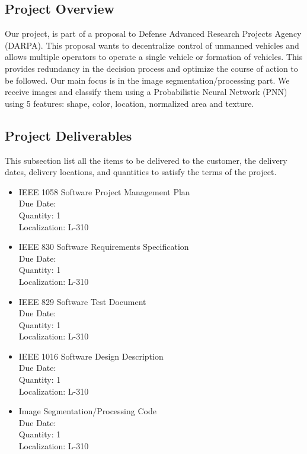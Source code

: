 \documentclass[12pt]{article}
\begin{document}
\subsection{Project Overview}
 Our project, is part of a proposal to Defense Advanced Research Projects Agency (DARPA). This proposal wants to decentralize control of unmanned vehicles and allows multiple operators to operate a single vehicle or formation of vehicles. This provides redundancy in the decision process and optimize the course of action to be followed. Our main focus is in the image segmentation/processing part. We receive images and classify them using a Probabilistic Neural Network (PNN) using 5 features: shape, color, location, normalized area and texture.

\subsection{Project Deliverables}
This subsection list all the items to be delivered to the customer, the delivery dates, delivery locations, and quantities to satisfy the terms of the project.
\begin{itemize}
  \item IEEE 1058 Software Project Management Plan\\
            Due Date: \\
            Quantity: 1\\
            Localization: L-310
  \item IEEE 830 Software Requirements Specification\\
            Due Date: \\
            Quantity: 1\\
            Localization: L-310
  \item IEEE 829 Software Test Document \\
            Due Date: \\
            Quantity: 1\\
            Localization: L-310

  \item IEEE 1016 Software Design Description\\
            Due Date:\\
            Quantity: 1\\
            Localization: L-310

  \item Image Segmentation/Processing Code\\
            Due Date:\\
            Quantity: 1\\
            Localization: L-310
\end{itemize}
\end{document}
